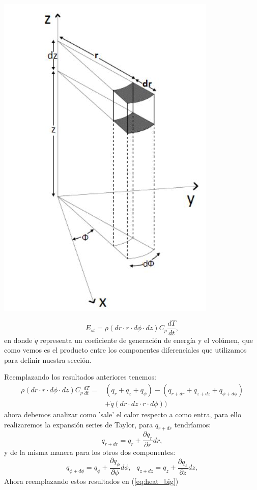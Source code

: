 \documentclass{beamer}
\begin{document}
\begin{frame}{}

\begin{block}{}
	\begin{center}
		\includegraphics[width=0.2\linewidth]{EDPheat.JPG}
	\end{center}
	$$E_{st} = \rho (dr \cdot r \cdot d\phi \cdot dz) C_p \frac{dT}{dt},$$
	en donde $\dot{q}$ representa un coeficiente de generación de energía y el volúmen, que como vemos es el producto entre los componentes diferenciales que utilizamos para definir nuestra sección.
\end{block}

\end{frame}

\begin{frame}{}

\begin{block}{}
	Reemplazando los resultados anteriores tenemos:
	\begin{equation}
		\begin{split}
		\rho (dr \cdot r \cdot d\phi \cdot dz) C_p \frac{dT}{dt} = & (q_r + q_z + q_{\phi}) - (q_{r + dr} + q_{z + dz} + q_{\phi + d \phi}) \\
		&+ \dot{q}(dr \cdot dz \cdot r  \cdot d\phi))
		\end{split}
		\label{eq:heat_big}
	\end{equation}
ahora debemos analizar como 'sale' el calor respecto a como entra, para ello realizaremos la expansión series de Taylor, para $q_{r + dr}$ tendríamos:
$$q_{r + dr} = q_r + \frac{\partial q_r}{\partial r} dr,$$
y de la misma manera para los otros dos componentes:
$$q_{\phi + d\phi} = q_{\phi} + \frac{\partial q_{\phi}}{\partial \phi} d\phi, \text{  } q_{z + dz} = q_{z} + \frac{\partial q_{z}}{\partial z} dz,$$
Ahora reemplazando estos resultados en (\ref{eq:heat_big})
 
\end{block}

\end{frame}
\end{document}
